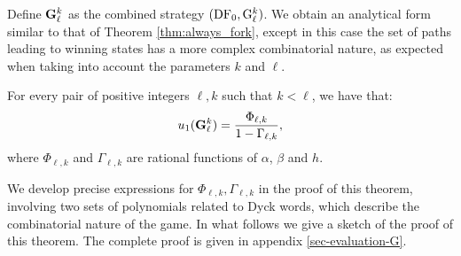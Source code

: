 Define ${\rm {\bf G}}_\ell^k$ as the combined strategy $(\text{\rm DF}_0, {\rm {G}}_\ell^k)$. We obtain an analytical form similar to that of Theorem \ref{thm:always_fork}, except in 
this case the set of paths leading to winning states has a more complex combinatorial nature, as expected when taking into account the 
parameters $k$ and $\ell$.
\begin{theorem}\label{thm-dificil}
For every pair of positive integers $\ell, k$ such that $k< \ell$, we have that:
$$u_1({\rm {\bf G}}^k_\ell) = \frac{\Phi_{\ell,k}}{1-\Gamma_{\ell,k}},$$
where $\Phi_{\ell,k}$ and $\Gamma_{\ell,k}$ are rational functions of $\alpha$, $\beta$ and $h$.%
\end{theorem}
We develop precise expressions for $\Phi_{\ell, k},\Gamma_{\ell,k}$ in the
proof of this theorem,
 involving two sets
of polynomials related to Dyck words, which describe the combinatorial nature of
the game. In what follows we give a sketch of the proof of this theorem. The complete proof is given in appendix \ref{sec-evaluation-G}.

\medskip

